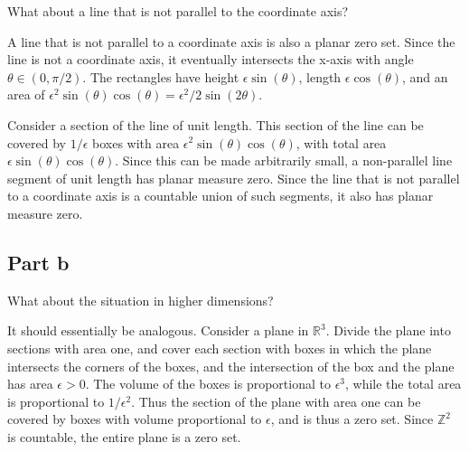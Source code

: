 \documentclass{article}
\newcommand{\R}{\mathbb{R}}
\newcommand{\Z}{\mathbb{Z}}
\begin{document}
What about a line that is not parallel to the coordinate axis?

A line that is not parallel to a coordinate axis is also a planar zero set. Since the line is not a coordinate axis, it eventually intersects the x-axis with angle $\theta \in (0, \pi/2)$. The rectangles have height $\epsilon \sin(\theta)$, length $\epsilon \cos(\theta)$, and an area of $\epsilon^2 \sin(\theta) \cos(\theta) = \epsilon^2/2 \sin(2\theta)$.

Consider a section of the line of unit length. This section of the line can be covered by $1/\epsilon$ boxes with area $\epsilon^2 \sin(\theta) \cos(\theta)$, with total area $\epsilon \sin(\theta) \cos(\theta)$. Since this can be made arbitrarily small, a non-parallel line segment of unit length has planar measure zero. Since the line that is not parallel to a coordinate axis is a countable union of such segments, it also has planar measure zero.

\subsection*{Part b}

What about the situation in higher dimensions?

It should essentially be analogous. Consider a plane in $\R^3$.  Divide the plane into sections with area one, and cover each section with boxes in which the plane intersects the corners of the boxes, and the intersection of the box and the plane has area $\epsilon > 0$. The volume of the boxes is proportional to $\epsilon^3$, while the total area is proportional to $1/\epsilon^2$. Thus the section of the plane with area one can be covered by boxes with volume proportional to $\epsilon$, and is thus a zero set. Since $\Z^2$ is countable, the entire plane is a zero set.
\end{document}
